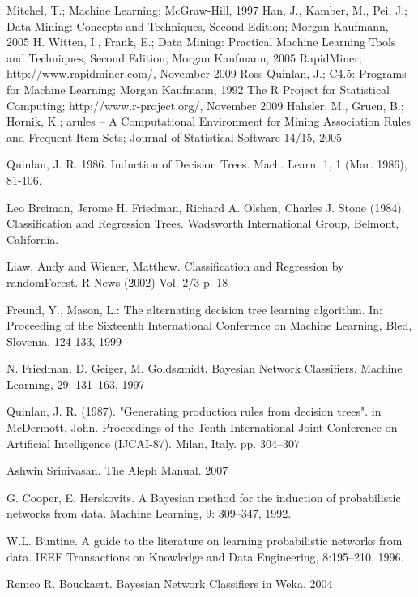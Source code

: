 \documentclass[a4paper]{llncs}
\begin{document}
\begin{thebibliography}{1}
Mitchel, T.; Machine Learning; McGraw-Hill, 1997
Han, J., Kamber, M., Pei, J.; Data Mining: Concepts and Techniques, Second Edition; Morgan Kaufmann, 2005
H. Witten, I., Frank, E.; Data Mining: Practical Machine Learning Tools and Techniques, Second Edition; Morgan Kaufmann, 2005
RapidMiner; \url{http://www.rapidminer.com/}, November 2009
Ross Quinlan, J.; C4.5: Programs for Machine Learning; Morgan Kaufmann, 1992
The R Project for Statistical Computing; http://www.r-project.org/, November 2009
Hahsler, M., Gruen, B.; Hornik, K.; arules -- A Computational Environment for Mining Association Rules and Frequent Item Sets; Journal of Statistical Software 14/15, 2005

Quinlan, J. R. 1986. Induction of Decision Trees. Mach. Learn. 1, 1 (Mar. 1986), 81-106.

Leo Breiman, Jerome H. Friedman, Richard A. Olshen, Charles J. Stone (1984). Classification and Regression Trees. Wadsworth International Group, Belmont, California.

Liaw, Andy and Wiener, Matthew. Classification and Regression by randomForest. R News (2002) Vol. 2/3 p. 18

Freund, Y., Mason, L.: The alternating decision tree learning algorithm. In: Proceeding of the Sixteenth International Conference on Machine Learning, Bled, Slovenia, 124-133, 1999

N. Friedman, D. Geiger, M. Goldszmidt. Bayesian Network Classifiers. Machine Learning, 29: 131–163, 1997

Quinlan, J. R. (1987). "Generating production rules from decision trees". in McDermott, John. Proceedings of the Tenth International Joint Conference on Artificial Intelligence (IJCAI-87). Milan, Italy. pp. 304–307

Ashwin Srinivasan. The Aleph Manual. 2007

G. Cooper, E. Herskovits. A Bayesian method for the induction of probabilistic networks from 
data. Machine Learning, 9: 309–347, 1992.

W.L. Buntine. A guide to the literature on learning probabilistic networks from data. IEEE 
Transactions on Knowledge and Data Engineering, 8:195–210, 1996.

Remco R. Bouckaert. Bayesian Network Classifiers in Weka. 2004


\end{thebibliography}
\end{document}
